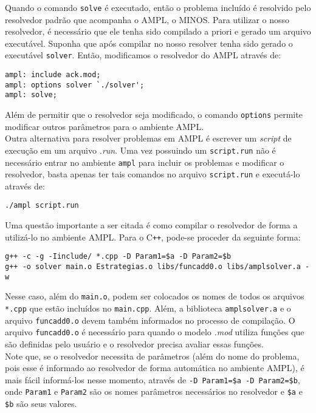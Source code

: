 \documentclass{article}
\begin{document}
Quando o comando \verb|solve| é executado, então o problema incluído é resolvido pelo resolvedor padrão que acompanha o AMPL, o MINOS. Para utilizar o nosso resolvedor, é necessário que ele tenha sido compilado a priori e gerado um arquivo executável. Suponha que após compilar no nosso resolver tenha sido gerado o executável \verb|solver|. Então, modificamos o resolvedor do AMPL através de:
\begin{verbatim}
ampl: include ack.mod;
ampl: options solver `./solver';
ampl: solve;
\end{verbatim}

Além de permitir que o resolvedor seja modificado, o comando \verb|options| permite modificar outros parâmetros para o ambiente AMPL.\\

Outra alternativa para resolver problemas em AMPL é escrever um \textit{script} de execução em um arquivo \textit{.run}. Uma vez possuindo um \verb|script.run| não é necessário entrar no ambiente \verb|ampl| para incluir os problemas e modificar o resolvedor, basta apenas ter tais comandos no arquivo \verb|script.run| e executá-lo através de:
\begin{verbatim}
./ampl script.run
\end{verbatim}

Uma questão importante a ser citada é como compilar o resolvedor de forma a utilizá-lo no ambiente AMPL. Para o C\verb|++|, pode-se proceder da seguinte forma:
\begin{verbatim}
g++ -c -g -Iinclude/ *.cpp -D Param1=$a -D Param2=$b
g++ -o solver main.o Estrategias.o libs/funcadd0.o libs/amplsolver.a -w  
\end{verbatim}

Nesse caso, além do \verb|main.o|, podem ser colocados os nomes de todos os arquivos \verb|*.cpp| que estão incluídos no \verb|main.cpp|. Além, a biblioteca \verb|amplsolver.a| e o arquivo \verb|funcadd0.o| devem também informados no processo de compilação. O arquivo \verb|funcadd0.o| é necessário para quando o modelo \textit{.mod} utiliza funções que são definidas pelo usuário e o resolvedor precisa avaliar essas funções. \\

Note que, se o resolvedor necessita de parâmetros (além do nome do problema, pois esse é informado ao resolvedor de forma automática no ambiente AMPL), é mais fácil informá-los nesse momento, através de \verb|-D Param1=$a -D Param2=$b|, onde \verb|Param1| e \verb|Param2| são os nomes parâmetros necessários no resolvedor e \verb|$a| e \verb|$b| são seus valores.
\end{document}
